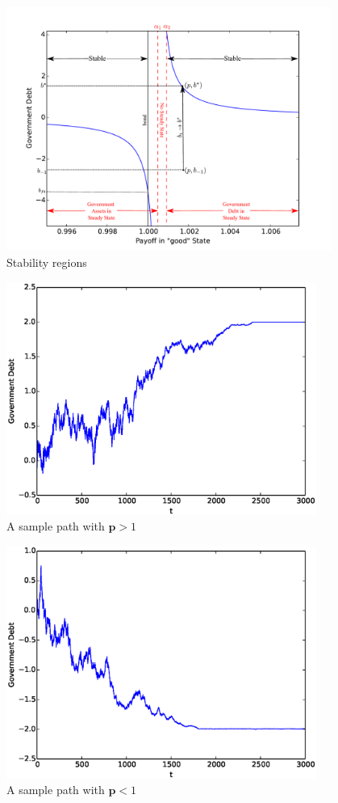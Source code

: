 \documentclass[12pt]{article}
\begin{document}
\begin{enumerate}
	\begin{figure}
		\begin{center}
		\includegraphics[width = 4.2in]{Images/graph_stable.pdf}
\caption{Stability regions}
	\end{center}	
	\end{figure}	

\begin{figure}
	\begin{center}
	\includegraphics[width=4in]{Images/port1.eps}
    \caption{A sample path with  $\bm{p} > 1$}
	\end{center}
\end{figure}

\begin{figure}
	\begin{center}
	\includegraphics[width=4in]{Images/port2.eps}
\caption{A sample path with   $\bm{p} <1$}
	\end{center}	
\end{figure}




\end{enumerate}
\end{document}
